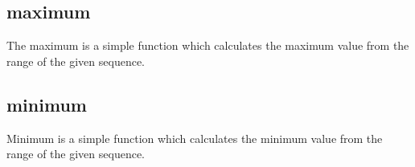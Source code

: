 \documentclass{article}
\begin{document}
\subsection{maximum}
\label{math:maximum}
The maximum is a simple function which calculates the maximum value from the range of the given sequence.

\subsection{minimum}
\label{math:minimum}
Minimum is a simple function which calculates the minimum value from the range of the given sequence.
\end{document}
